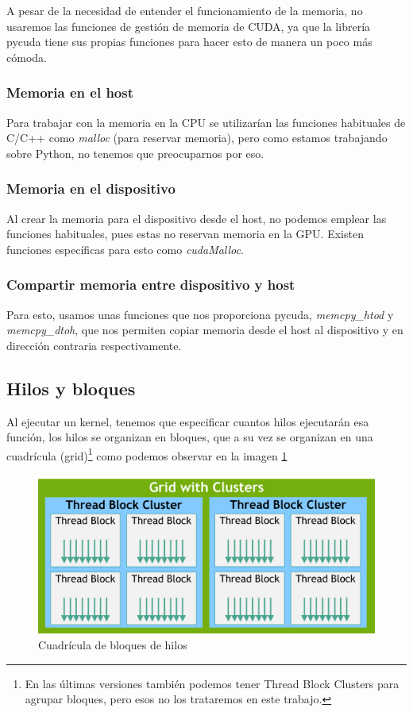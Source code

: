 A pesar de la necesidad de entender el funcionamiento de la memoria, no usaremos las funciones de  gestión de memoria de CUDA, ya que la librería pycuda tiene sus propias funciones para hacer esto de manera un poco más cómoda.
\subsubsection{Memoria en el host}
Para trabajar con la memoria en la \ac{CPU} se utilizarían las funciones habituales de C/C++ como \emph{malloc} (para reservar memoria), pero como estamos trabajando sobre Python, no tenemos que preocuparnos por eso.
\subsubsection{Memoria en el dispositivo}
Al crear la memoria para el dispositivo desde el host, no podemos emplear las funciones habituales, pues estas no reservan memoria en la \ac{GPU}. Existen funciones específicas para esto como \emph{cudaMalloc}.
\subsubsection{Compartir memoria entre dispositivo y host}
Para esto, usamos unas funciones que nos proporciona pycuda, \emph{memcpy\_htod} y \emph{memcpy\_dtoh}, que nos permiten copiar memoria desde el host al dispositivo y en dirección contraria respectivamente.

\subsection{Hilos y bloques}
Al ejecutar un kernel, tenemos que especificar cuantos hilos ejecutarán esa función, los hilos se organizan en bloques, que a su vez se organizan en una cuadrícula (grid)\footnote{En las últimas versiones también podemos tener Thread Block Clusters para agrupar bloques, pero esos no los trataremos en este trabajo.} como podemos observar en la imagen \ref{fig:grid}


\begin{figure}
	\centering
	\includegraphics[width=0.7\linewidth]{Imagenes/Bitmap/grid}
	\caption{Cuadrícula de bloques de hilos}
	\label{fig:grid}
\end{figure}


